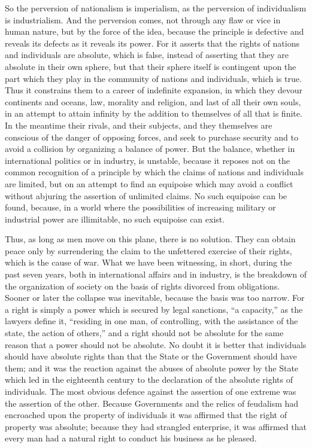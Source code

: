 \documentclass{book}
\begin{document}
So the perversion of nationalism is imperialism, as the perversion of individualism is industrialism. And the perversion comes, not through any flaw or vice in human nature, but by the force of the idea, because the principle is defective and reveals its defects as it reveals its power. For it asserts that the rights of nations and individuals are absolute, which is false, instead of asserting that they are absolute in their own sphere, but that their sphere itself is contingent upon the part which they play in the community of nations and individuals, which is true. Thus it constrains them to a career of indefinite expansion, in which they devour continents and oceans, law, morality and religion, and last of all their own souls, in an attempt to attain infinity by the addition to themselves of all that is finite. In the meantime their rivals, and their subjects, and they themselves are conscious of the danger of opposing forces, and seek to purchase security and to avoid a collision by organizing a balance of power. But the balance, whether in international politics or in industry, is unstable, because it reposes not on the common recognition of a principle by which the claims of nations and individuals are limited, but on an attempt to find an equipoise which may avoid a conflict without abjuring the assertion of unlimited claims. No such equipoise can be found, because, in a world where the possibilities of increasing military or industrial power are illimitable, no such equipoise can exist.

Thus, as long as men move on this plane, there is no solution. They can obtain peace only by surrendering the claim to the unfettered exercise of their rights, which is the cause of war. What we have been witnessing, in short, during the past seven years, both in international affairs and in industry, is the breakdown of the organization of society on the basis of rights divorced from obligations. Sooner or later the collapse was inevitable, because the basis was too narrow. For a right is simply a power which is secured by legal sanctions, “a capacity,” as the lawyers define it, “residing in one man, of controlling, with the assistance of the state, the action of others,” and a right should not be absolute for the same reason that a power should not be absolute. No doubt it is better that individuals should have absolute rights than that the State or the Government should have them; and it was the reaction against the abuses of absolute power by the State which led in the eighteenth century to the declaration of the absolute rights of individuals. The most obvious defence against the assertion of one extreme was the assertion of the other. Because Governments and the relics of feudalism had encroached upon the property of individuals it was affirmed that the right of property was absolute; because they had strangled enterprise, it was affirmed that every man had a natural right to conduct his business as he pleased.
\end{document}
